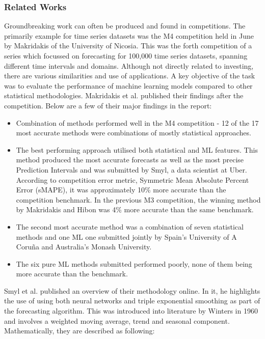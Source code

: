 \documentclass[10pt,onecolumn,letterpaper]{article}
\begin{document}
\subsubsection{Related Works}

Groundbreaking work can often be produced and found in competitions. The primarily example for time series datasets was the M4 competition held in June by Makridakis of the University of Nicosia. This was the forth competition of a series which focussed on forecasting for 100,000 time series datasets, spanning different time intervals and domains. Although not directly related to investing, there are various similarities and use of applications. A key objective of the task was to evaluate the performance of machine learning models compared to other statistical methodologies. Makridakis et al.\cite{Makridakis} published their findings after the competition. Below are a few of their major findings in the report:

\begin{itemize}
	\item Combination of methods performed well in the M4 competition - 12 of the 17 most accurate methods were combinations of mostly statistical approaches.
	\item The best performing approach utilised both statistical and ML features. This method produced the most accurate forecasts as well as the most precise Prediction Intervals and was submitted by Smyl, a data scientist at Uber. According to competition error metric, Symmetric Mean Absolute Percent Error (sMAPE), it was approximately 10\% more accurate than the competition benchmark. In the previous M3 competition, the winning method by Makridakis and Hibon was 4\% more accurate than the same benchmark.
	\item The second most accurate method was a combination of seven statistical methods and one ML one submitted jointly by Spain’s University of A Coruña and Australia’s Monash University.
	\item The six pure ML methods submitted performed poorly, none of them being more accurate than the benchmark.
\end{itemize}

Smyl et al. published an overview of their methodology online\cite{Smyl}. In it, he highlights the use of using both neural networks and triple exponential smoothing as part of the forecasting algorithm. This was introduced into literature by Winters\cite{Winters} in 1960 and involves a weighted moving average, trend and seasonal component. Mathematically, they are described as following: 
\end{document}
